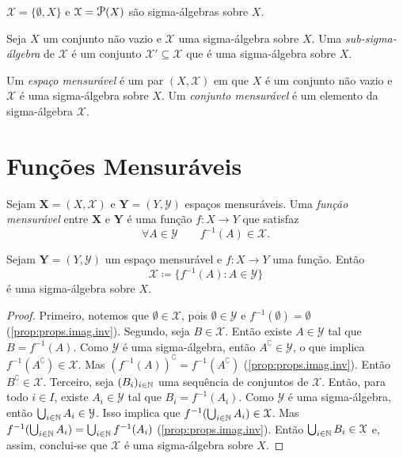 \begin{ex}
	$\mathcal X = \{\emptyset,X\}$ e $\mathcal X = \p(X)$ são sigma-álgebras sobre $X$.
\end{ex}

\begin{defi}
	Seja $X$ um conjunto não vazio e $\mathcal X$ uma sigma-álgebra sobre $X$. Uma \emph{sub-sigma-álgebra} de $\mathcal X$ é um conjunto $\mathcal X' \subseteq \mathcal X$ que é uma sigma-álgebra sobre $X$.
\end{defi}

\begin{defi}
	Um \emph{espaço mensurável} é um par $(X,\mathcal X)$ em que $X$ é um conjunto não vazio e $\mathcal X$ é uma sigma-álgebra sobre $X$. Um \emph{conjunto mensurável} é um elemento da sigma-álgebra $\mathcal X$.
\end{defi}

\section{Funções Mensuráveis}

\begin{defi}
	Sejam $\bm X = (X,\mathcal X)$ e $\bm Y = (Y,\mathcal Y)$ espaços mensuráveis. Uma \emph{função mensurável} entre $\bm X$ e $\bm Y$ é uma função $f: X \to Y$ que satisfaz
	\begin{equation*}
	\forall A \in \mathcal Y \qquad f^{-1}(A) \in \mathcal X.
	\end{equation*}
\end{defi}

\begin{prop}
	Sejam $\bm Y = (Y,\mathcal Y)$ um espaço mensurável e $f: X \to Y$ uma função. Então
	\begin{equation*}
	\mathcal X \coloneqq \{f^{-1}(A) : A \in \mathcal Y\}
	\end{equation*}
é uma sigma-álgebra sobre $X$.
\end{prop}
\begin{proof}
	Primeiro, notemos que $\emptyset \in \mathcal X$, pois $\emptyset \in \mathcal Y$ e $f^{-1}(\emptyset) = \emptyset$ (\ref{prop:props.imag.inv}). Segundo, seja $B \in \mathcal X$. Então existe $A \in \mathcal Y$ tal que $B = f^{-1}(A)$. Como $\mathcal Y$ é uma sigma-álgebra, então $A^\complement \in \mathcal Y$, o que implica $f^{-1}(A^\complement) \in \mathcal X$. Mas $(f^{-1}(A))^\complement = f^{-1}(A^\complement)$ (\ref{prop:props.imag.inv}). Então $B^\complement \in \mathcal X$. Terceiro, seja $(B_i)_{i \in \mathbb{N}}$ uma sequência de conjuntos de $\mathcal X$. Então, para todo $i \in I$, existe $A_i \in \mathcal Y$ tal que $B_i = f^{-1}(A_i)$. Como $\mathcal Y$ é uma sigma-álgebra, então $\bigcup_{i \in \mathbb{N}} A_i \in \mathcal Y$. Isso implica que $f^{-1}(\bigcup_{i \in \mathbb{N}} A_i) \in \mathcal X$. Mas $f^{-1}(\bigcup_{i \in \mathbb{N}} A_i) = \bigcup_{i \in \mathbb{N}} f^{-1}(A_i)$ (\ref{prop:props.imag.inv}). Então $\bigcup_{i \in \mathbb{N}} B_i \in \mathcal X$ e, assim, conclui-se que $\mathcal X$ é uma sigma-álgebra sobre $X$.
\end{proof}

